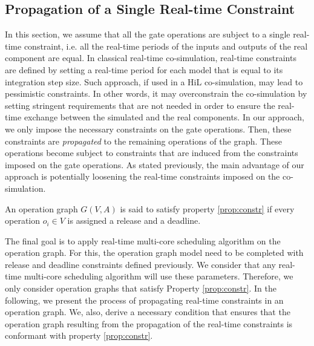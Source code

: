 \subsection{Propagation of a Single Real-time Constraint}

In this section, we assume that all the gate operations are subject to a single real-time constraint, i.e. all the real-time periods of the inputs and outputs of the real component are equal. In classical real-time co-simulation, real-time constraints are defined by setting a real-time period for each model that is equal to its integration step size. Such approach, if used in a HiL co-simulation, may lead to pessimistic constraints. In other words, it may overconstrain the co-simulation by setting stringent requirements that are not needed in order to ensure the real-time exchange between the simulated and the real components. In our approach, we only impose the necessary constraints on the gate operations. Then, these constraints are \textit{propagated} to the remaining operations of the graph. These operations become subject to constraints that are induced from the constraints imposed on the gate operations. As stated previously, the main advantage of our approach is potentially loosening the real-time constraints imposed on the co-simulation.

\begin{property}
An operation graph $G(V,A)$ is said to satisfy property \ref{prop:constr} if every operation $o_i \in V$ is assigned a release and a deadline. 
\label{prop:constr}
\end{property}

The final goal is to apply real-time multi-core scheduling algorithm on the operation graph. For this, the operation graph model need to be completed with release and deadline constraints defined previously. We consider that any real-time multi-core scheduling algorithm will use these parameters. Therefore, we only consider operation graphs that satisfy Property \ref{prop:constr}. In the following, we present the process of propagating real-time constraints in an operation graph. We, also, derive a necessary condition that ensures that the operation graph resulting from the propagation of the real-time constraints is conformant with property \ref{prop:constr}.


